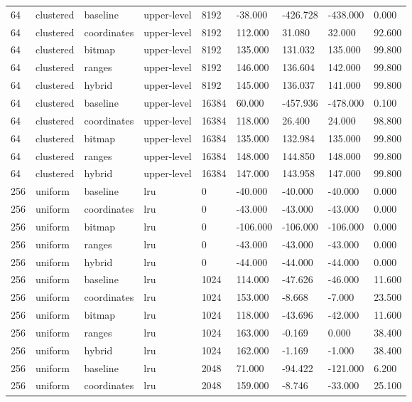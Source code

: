 \begin{tabular}{lllllllll}
64 & clustered & baseline & upper-level & 8192 & -38.000 & -426.728 & -438.000 & 0.000 \\
64 & clustered & coordinates & upper-level & 8192 & 112.000 & 31.080 & 32.000 & 92.600 \\
64 & clustered & bitmap & upper-level & 8192 & 135.000 & 131.032 & 135.000 & 99.800 \\
64 & clustered & ranges & upper-level & 8192 & 146.000 & 136.604 & 142.000 & 99.800 \\
64 & clustered & hybrid & upper-level & 8192 & 145.000 & 136.037 & 141.000 & 99.800 \\
64 & clustered & baseline & upper-level & 16384 & 60.000 & -457.936 & -478.000 & 0.100 \\
64 & clustered & coordinates & upper-level & 16384 & 118.000 & 26.400 & 24.000 & 98.800 \\
64 & clustered & bitmap & upper-level & 16384 & 135.000 & 132.984 & 135.000 & 99.800 \\
64 & clustered & ranges & upper-level & 16384 & 148.000 & 144.850 & 148.000 & 99.800 \\
64 & clustered & hybrid & upper-level & 16384 & 147.000 & 143.958 & 147.000 & 99.800 \\
256 & uniform & baseline & lru & 0 & -40.000 & -40.000 & -40.000 & 0.000 \\
256 & uniform & coordinates & lru & 0 & -43.000 & -43.000 & -43.000 & 0.000 \\
256 & uniform & bitmap & lru & 0 & -106.000 & -106.000 & -106.000 & 0.000 \\
256 & uniform & ranges & lru & 0 & -43.000 & -43.000 & -43.000 & 0.000 \\
256 & uniform & hybrid & lru & 0 & -44.000 & -44.000 & -44.000 & 0.000 \\
256 & uniform & baseline & lru & 1024 & 114.000 & -47.626 & -46.000 & 11.600 \\
256 & uniform & coordinates & lru & 1024 & 153.000 & -8.668 & -7.000 & 23.500 \\
256 & uniform & bitmap & lru & 1024 & 118.000 & -43.696 & -42.000 & 11.600 \\
256 & uniform & ranges & lru & 1024 & 163.000 & -0.169 & 0.000 & 38.400 \\
256 & uniform & hybrid & lru & 1024 & 162.000 & -1.169 & -1.000 & 38.400 \\
256 & uniform & baseline & lru & 2048 & 71.000 & -94.422 & -121.000 & 6.200 \\
256 & uniform & coordinates & lru & 2048 & 159.000 & -8.746 & -33.000 & 25.100 \\

\end{tabular}

